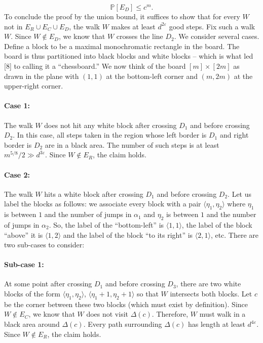 \[\mathbb P[E_D]\leq c^m.\]
To conclude the proof by the union bound, it suffices to show that for every $W$ not in $E_R\cup E_C\cup E_D$, the walk $W$ makes at least $d^{2\varepsilon}$ good steps. Fix such a walk $W$. Since $W\notin E_D$, we know that $W$ crosses the line $D_2$.
We consider several cases. Define a block to be a maximal monochromatic rectangle in the board. The board is thus partitioned into black blocks and white blocks -- which is what led [8] to calling it a ``chessboard.'' We now think of the board $[m]\times[2m]$ as drawn in the plane with $(1,1)$ at the bottom-left corner and $(m,2m)$ at the upper-right corner.
\paragraph{Case 1:} The walk $W$ does not hit any white block after crossing $D_1$ and before crossing $D_2$. In this case, all steps taken in the region whose left border is $D_1$ and right border is $D_2$ are in a black area. The number of such steps is at least $m^{5/8}/2\gg d^{3\varepsilon}$. Since $W\notin E_R$, the claim holds.
\paragraph{Case 2:} The walk $W$ hits a white block after crossing $D_1$ and before crossing $D_2$. Let us label the blocks as follows: we associate every block with a pair $\langle\eta_1,\eta_2\rangle$ where $\eta_1$ is between $1$ and the number of jumps in $\alpha_1$ and $\eta_2$ is between $1$ and the number of jumps in $\alpha_2$. So, the label of the ``bottom-left'' is $\langle1,1\rangle$, the label of the block ``above'' it is $\langle1,2\rangle$ and the label of the block ``to its right'' is $\langle2,1\rangle$, etc. There are two sub-cases to consider:
\paragraph{Sub-case 1:} At some point after crossing $D_1$ and before crossing $D_3$, there are two white blocks of the form $\langle\eta_1,\eta_2\rangle$, $\langle\eta_1+1,\eta_2+1\rangle$ so that $W$ intersects both blocks. Let $c$ be the corner between these two blocks (which must exist by definition). Since $W\notin E_C$, we know that $W$ does not visit $\Delta(c)$. Therefore, $W$ must walk in a black area around $\Delta(c)$. Every path surrounding $\Delta(c)$ has length at least $d^{4\varepsilon}$. Since $W\notin E_R$, the claim holds.
